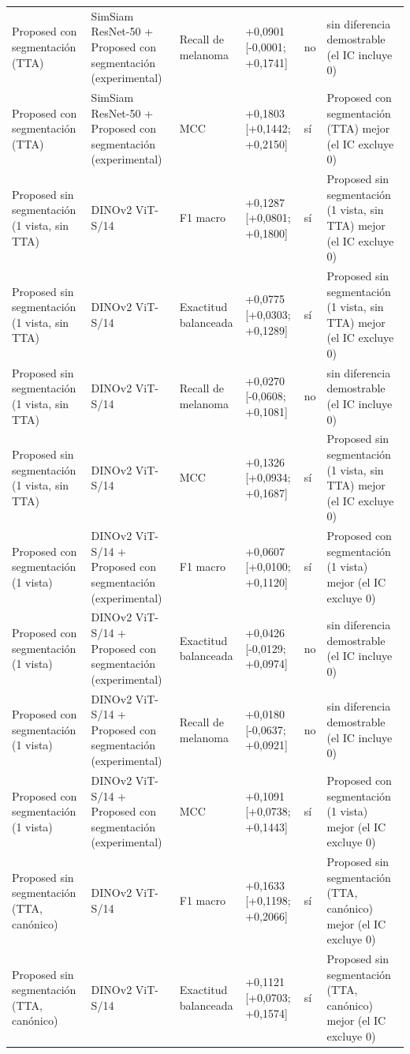 \begin{longtable}{@{}llllll@{}}
Proposed con segmentación (TTA) & SimSiam ResNet-50 + Proposed con segmentación (experimental) & Recall de melanoma & +0,0901 [-0,0001; +0,1741] & no & sin diferencia demostrable (el IC incluye 0) \\
Proposed con segmentación (TTA) & SimSiam ResNet-50 + Proposed con segmentación (experimental) & MCC & +0,1803 [+0,1442; +0,2150] & sí & Proposed con segmentación (TTA) mejor (el IC excluye 0) \\
Proposed sin segmentación (1 vista, sin TTA) & DINOv2 ViT-S/14 & F1 macro & +0,1287 [+0,0801; +0,1800] & sí & Proposed sin segmentación (1 vista, sin TTA) mejor (el IC excluye 0) \\
Proposed sin segmentación (1 vista, sin TTA) & DINOv2 ViT-S/14 & Exactitud balanceada & +0,0775 [+0,0303; +0,1289] & sí & Proposed sin segmentación (1 vista, sin TTA) mejor (el IC excluye 0) \\
Proposed sin segmentación (1 vista, sin TTA) & DINOv2 ViT-S/14 & Recall de melanoma & +0,0270 [-0,0608; +0,1081] & no & sin diferencia demostrable (el IC incluye 0) \\
Proposed sin segmentación (1 vista, sin TTA) & DINOv2 ViT-S/14 & MCC & +0,1326 [+0,0934; +0,1687] & sí & Proposed sin segmentación (1 vista, sin TTA) mejor (el IC excluye 0) \\
Proposed con segmentación (1 vista) & DINOv2 ViT-S/14 + Proposed con segmentación (experimental) & F1 macro & +0,0607 [+0,0100; +0,1120] & sí & Proposed con segmentación (1 vista) mejor (el IC excluye 0) \\
Proposed con segmentación (1 vista) & DINOv2 ViT-S/14 + Proposed con segmentación (experimental) & Exactitud balanceada & +0,0426 [-0,0129; +0,0974] & no & sin diferencia demostrable (el IC incluye 0) \\
Proposed con segmentación (1 vista) & DINOv2 ViT-S/14 + Proposed con segmentación (experimental) & Recall de melanoma & +0,0180 [-0,0637; +0,0921] & no & sin diferencia demostrable (el IC incluye 0) \\
Proposed con segmentación (1 vista) & DINOv2 ViT-S/14 + Proposed con segmentación (experimental) & MCC & +0,1091 [+0,0738; +0,1443] & sí & Proposed con segmentación (1 vista) mejor (el IC excluye 0) \\
Proposed sin segmentación (TTA, canónico) & DINOv2 ViT-S/14 & F1 macro & +0,1633 [+0,1198; +0,2066] & sí & Proposed sin segmentación (TTA, canónico) mejor (el IC excluye 0) \\
Proposed sin segmentación (TTA, canónico) & DINOv2 ViT-S/14 & Exactitud balanceada & +0,1121 [+0,0703; +0,1574] & sí & Proposed sin segmentación (TTA, canónico) mejor (el IC excluye 0) \\

\end{longtable}
